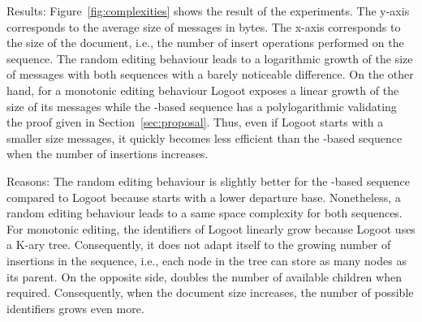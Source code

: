 \begin{asparadesc}
\item [Results:] Figure~\ref{fig:complexities} shows the result of the
  experiments. The y-axis corresponds to the average size of messages in
  bytes. The x-axis corresponds to the size of the document, i.e., the number
  of insert operations performed on the sequence. The random editing behaviour
  leads to a logarithmic growth of the size of messages with both sequences
  with a barely noticeable difference. On the other hand, for a monotonic
  editing behaviour Logoot exposes a linear growth of the size of its messages
  while the \LSEQ-based sequence has a polylogarithmic validating the proof
  given in Section~\ref{sec:proposal}. Thus, even if Logoot starts with a
  smaller size messages, it quickly becomes less efficient than the
  \LSEQ-based sequence when the number of insertions increases.

\item [Reasons:] The random editing behaviour is slightly better for the
  \LSEQ-based sequence compared to Logoot because \LSEQ starts with a lower
  departure base. Nonetheless, a random editing behaviour leads to a same space
  complexity for both sequences. For monotonic editing, the identifiers of
  Logoot linearly grow because Logoot uses a K-ary tree. Consequently, it does
  not adapt itself to the growing number of insertions in the sequence, i.e.,
  each node in the tree can store as many nodes as its parent. On the opposite
  side, \LSEQ doubles the number of available children when
  required. Consequently, when the document size increases, the number of
  possible identifiers grows even more.
\end{asparadesc}

\ \\


